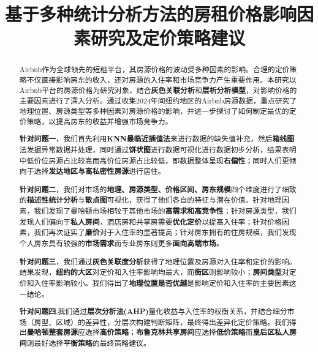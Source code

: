 \documentclass[12pt]{article}
\title{ \textbf{基于多种统计分析方法的房租价格影响因素研究及定价策略建议}}
\date{}
\begin{document}
\begin{CJK}{UTF8}{gbsn}
	
	\maketitle  %
	
	\setcounter{page}{1}
	
	\vspace{-7em}
	\begin{abstract}  %
		\vspace{1em}
		Airbnb作为全球领先的短租平台，其房源价格的波动受多种因素的影响。合理的定价策略不仅直接影响房东的收入，还对房源的入住率和市场竞争力产生重要作用。本研究以Airbnb平台的房源价格为研究对象，结合\textbf{灰色关联分析}和\textbf{层析分析模型}，对影响价格的主要因素进行了深入分析。通过收集2024年间纽约地区的Airbnb房源数据，重点研究了地理位置、房源类型等多种因素对房源价格的影响，并进一步探讨了如何制定最优的定价策略，以提高房东的收益并增强市场竞争力。
		
		\textbf{针对问题一}，我们首先利用\textbf{KNN最临近插值法}来进行数据的缺失值补充，然后\textbf{箱线图}法发掘异常数据并处理，同时通过\textbf{饼状图}进行数据可视化进行数据初步分析，结果表明中低价位房源占比较高而高价位房源占比较低，即数据整体呈现\textbf{右偏性}；同时人们更倾向于选择\textbf{发达地区与高私密性房源}进行居住。
		
		\textbf{针对问题二}，我们对市场的\textbf{地理、房源类型、价格区间、房东规模}四个维度进行了细致的\textbf{描述性统计分析}与\textbf{散点图}可视化，获得了他们各自的特征与潜在价值。针对地理因素，我们发现了曼哈顿市场相较于其他市场的\textbf{高需求和高竞争性}；针对房源类型，我们发现人们偏向于\textbf{私人房间}，酒店房和共享房需要\textbf{优化定价}以提高入住率；针对价格因素，我们再次证实了\textbf{廉价}对于入住率的显著提高；针对房东拥有的住房规模，我们发现个人房东具有较强的\textbf{市场需求}而专业房东则更多\textbf{面向高端市场}。
		
		\textbf{针对问题三}，我们通过\textbf{灰色关联度分析}获得了地理位置及房源对入住率和定价的影响。结果发现，\textbf{纽约的大区}对定价和入住率影响均最大，而\textbf{街区}则影响较小；\textbf{房间类型}对定价和入住率影响较小。我们得出了\textbf{地理位置是否优越}是影响定价和入住率的主要因素这一结论。
		
		\textbf{针对问题四},我们通过\textbf{层次分析法(AHP)}量化收益与入住率的权衡关系，并结合细分市场（房型、区域）的差异性，分层次构建判断矩阵，最终得出差异化定价策略。我们得出\textbf{曼哈顿整套房源}应选择\textbf{高价策略}；\textbf{布鲁克林共享房间}应选择\textbf{低价策略}而\textbf{皇后区私人房间}则最好选择\textbf{平衡策略}的最终策略建议。\\
		

\end{abstract}
\end{CJK}
\end{document}
